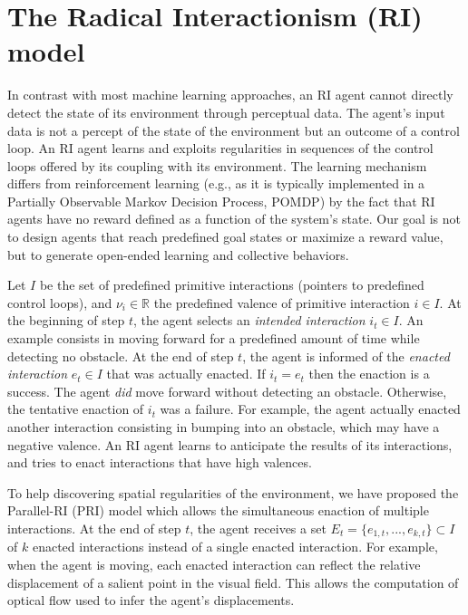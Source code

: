 \documentclass[conference]{IEEEtran}
\begin{document}
\section{The Radical Interactionism (RI) model}


In contrast with most machine learning approaches, an RI agent cannot directly detect the state of its environment through perceptual data. 
The agent's input data is not a percept of the state of the environment but an outcome of a control loop. 
An RI agent learns and exploits regularities in sequences of the control loops offered by its coupling with its environment.  
The learning mechanism differs from reinforcement learning (e.g., as it is typically implemented in a Partially Observable Markov Decision Process, POMDP) by the fact that RI agents have no reward defined as a function of the system's state. 
Our goal is not to design agents that reach predefined goal states or maximize a reward value, but to generate open-ended learning and collective behaviors.

Let $I$ be the set of predefined primitive interactions (pointers to predefined control loops), and $\nu_i \in \mathbb{R}$ the predefined valence of primitive interaction $i \in I$.
At the beginning of step $t$, the agent selects an \textit{intended interaction} $i_t \in I$. 
An example consists in moving forward for a predefined amount of time while detecting no obstacle.
At the end of step $t$, the agent is informed of the \textit{enacted interaction} $e_t \in I$ that was actually enacted. 
If $i_t = e_t$ then the enaction is a success. 
The agent \textit{did} move forward without detecting an obstacle. 
Otherwise, the tentative enaction of $i_t$ was a failure. 
For example, the agent actually enacted another interaction consisting in bumping into an obstacle, which may have a negative valence.
An RI agent learns to anticipate the results of its interactions, and tries to enact interactions that have high valences.

To help discovering spatial regularities of the environment, we have proposed the Parallel-RI (PRI) model which allows the simultaneous enaction of multiple interactions. At the end of step $t$, the agent receives a set $E_t=\{e_{1,t},..., e_{k,t}\} \subset I$ of $k$ enacted interactions instead of a single enacted interaction. 
For example, when the agent is moving, each enacted interaction can reflect the relative displacement of a salient point in the visual field. 
This allows the computation of optical flow used to infer the agent's displacements.  
\end{document}
